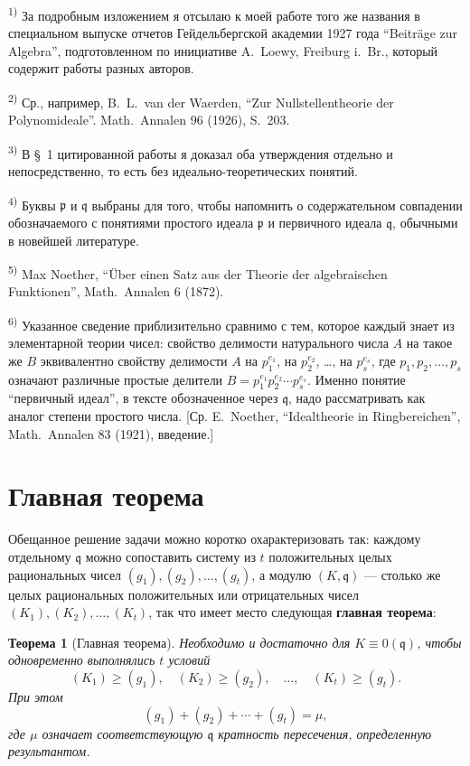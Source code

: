 \documentclass[11pt]{article}
\newcommand{\foreign}[1]{#1}
\theoremstyle{plain}
\newtheorem{satz}{Теорема}
\begin{document}
{\footnotesize
\textsuperscript{1)} За подробным изложением я отсылаю к моей работе того же
названия в специальном выпуске отчетов Гейдельбергской академии 1927 года
``Beiträge zur Algebra'', подготовленном по инициативе A.\ Loewy,
Freiburg i.\ Br., который содержит работы разных авторов.

\textsuperscript{2)} Ср., например, B.\ L.\ van der Waerden, ``Zur Nullstellentheorie der Polynomideale''.
\foreign{Math.\ Annalen} 96 (1926), S.~203.

\textsuperscript{3)} В \S~1 цитированной работы я доказал оба утверждения
отдельно и непосредственно, то есть без идеально-теоретических понятий.

\textsuperscript{4)} Буквы $\mathfrak{p}$ и $\mathfrak{q}$ выбраны для того,
чтобы напомнить о содержательном совпадении обозначаемого с понятиями
простого идеала $\mathfrak{p}$ и первичного идеала $\mathfrak{q}$, обычными
в новейшей литературе.

\textsuperscript{5)} Max Noether, ``Über einen Satz aus der Theorie der algebraischen Funktionen'',
\foreign{Math.\ Annalen} 6 (1872).

\textsuperscript{6)} Указанное сведение приблизительно сравнимо с тем, которое
каждый знает из элементарной теории чисел: свойство делимости натурального
числа $A$ на такое же $B$ эквивалентно свойству делимости $A$ на
$p_{1}^{e_{1}}$, на $p_{2}^{e_{2}}$, \ldots, на $p_{s}^{e_{s}}$, где
$p_{1}, p_{2}, \ldots, p_{s}$ означают различные простые делители
$B = p_{1}^{e_{1}}p_{2}^{e_{2}} \cdots p_{s}^{e_{s}}$. Именно понятие
``первичный идеал'', в тексте обозначенное через $\mathfrak{q}$, надо
рассматривать как аналог степени простого числа. [Ср. E.\ Noether,
``Idealtheorie in Ringbereichen'', \foreign{Math.\ Annalen} 83 (1921), введение.]
}

\newpage
\section*{Главная теорема}

Обещанное решение задачи можно коротко охарактеризовать так:
каждому отдельному $\mathfrak{q}$ можно сопоставить систему из $t$
положительных целых рациональных чисел
$(g_{1}), (g_{2}), \ldots, (g_{t})$, а модулю $(K, \mathfrak{q})$ ---
столько же целых рациональных положительных или отрицательных чисел
$(K_{1}), (K_{2}), \ldots, (K_{t})$, так что имеет место следующая
\textbf{главная теорема}:

\begin{satz}[Главная теорема]\label{satz:kap-II}
Необходимо и достаточно для $K \equiv 0(\mathfrak{q})$, чтобы
одновременно выполнялись $t$ условий
\[
(K_{1}) \geq (g_{1}), \quad (K_{2}) \geq (g_{2}), \quad\ldots,\quad (K_{t}) \geq (g_{t}).
\]
При этом
\[
(g_{1}) + (g_{2}) + \cdots + (g_{t}) = \mu,
\]
где $\mu$ означает соответствующую $\mathfrak{q}$ кратность
пересечения, определенную результантом.
\end{satz}
\end{document}
